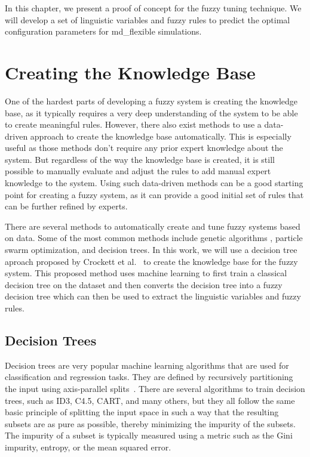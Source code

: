 
In this chapter, we present a proof of concept for the fuzzy tuning technique. We will develop a set of linguistic variables and fuzzy rules to predict the optimal configuration parameters for md\_flexible simulations.

\section{Creating the Knowledge Base}

One of the hardest parts of developing a fuzzy system is creating the knowledge base, as it typically requires a very deep understanding of the system to be able to create meaningful rules. However, there also exist methods to use a data-driven approach to create the knowledge base automatically. This is especially useful as those methods don't require any prior expert knowledge about the system. But regardless of the way the knowledge base is created, it is still possible to manually evaluate and adjust the rules to add manual expert knowledge to the system. Using such data-driven methods can be a good starting point for creating a fuzzy system, as it can provide a good initial set of rules that can be further refined by experts.

There are several methods to automatically create and tune fuzzy systems based on data. Some of the most common methods include genetic algorithms , particle swarm optimization, and decision trees.
In this work, we will use a decision tree aproach proposed by Crockett et al.~\cite{CROCKETT20062809} to create the knowledge base for the fuzzy system. This proposed method uses machine learning to first train a classical decision tree on the dataset and then converts the decision tree into a fuzzy decision tree which can then be used to extract the linguistic variables and fuzzy rules.


\subsection{Decision Trees}

Decision trees are very popular machine learning algorithms that are used for classification and regression tasks. They are defined by recursively partitioning the input using axis-parallel splits~\cite{10.5555/2380985}. There are several algorithms to train decision trees, such as ID3, C4.5, CART, and many others, but they all follow the same basic principle of splitting the input space in such a way that the resulting subsets are as pure as possible, thereby minimizing the impurity of the subsets. The impurity of a subset is typically measured using a metric such as the Gini impurity, entropy, or the mean squared error. 

